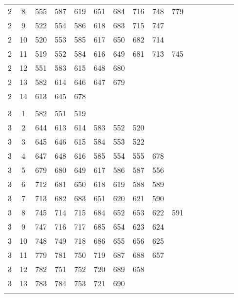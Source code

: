 {{\begin{table}[htbp]
\begin{center}
\begin{tabular}{cccccccccccccccc}
      2 &  8 & 555 & 587 & 619 & 651 & 684 & 716 & 748 & 779 \\
      2 &  9 & 522 & 554 & 586 & 618 & 683 & 715 & 747 \\
      2 & 10 & 520 & 553 & 585 & 617 & 650 & 682 & 714 \\
      2 & 11 & 519 & 552 & 584 & 616 & 649 & 681 & 713 & 745 \\
      2 & 12 & 551 & 583 & 615 & 648 & 680 \\
      2 & 13 & 582 & 614 & 646 & 647 & 679 \\
      2 & 14 & 613 & 645 & 678 \\
      && \\
      3 &  1 & 582 & 551 & 519 \\
      3 &  2 & 644 & 613 & 614 & 583 & 552 & 520 \\
      3 &  3 & 645 & 646 & 615 & 584 & 553 & 522 \\
      3 &  4 & 647 & 648 & 616 & 585 & 554 & 555 & 678 \\
      3 &  5 & 679 & 680 & 649 & 617 & 586 & 587 & 556 \\
      3 &  6 & 712 & 681 & 650 & 618 & 619 & 588 & 589 \\
      3 &  7 & 713 & 682 & 683 & 651 & 620 & 621 & 590 \\
      3 &  8 & 745 & 714 & 715 & 684 & 652 & 653 & 622 & 591 \\
      3 &  9 & 747 & 716 & 717 & 685 & 654 & 623 & 624 \\
      3 & 10 & 748 & 749 & 718 & 686 & 655 & 656 & 625 \\
      3 & 11 & 779 & 781 & 750 & 719 & 687 & 688 & 657 \\
      3 & 12 & 782 & 751 & 752 & 720 & 689 & 658 \\
      3 & 13 & 783 & 784 & 753 & 721 & 690 \\
      && \\
    \end{tabular}
  \end{center}
\label{tab:tres rows}
\end{table} }}
 
